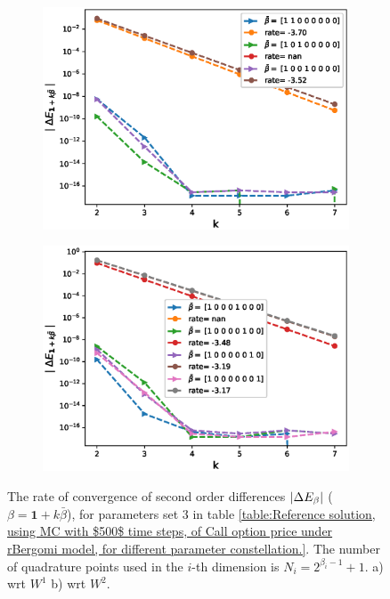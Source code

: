 \begin{figure}[h!]
	\centering
	\begin{subfigure}{.3\textwidth}
		\centering
		\includegraphics[width=1\linewidth]{./figures/rBergomi_mixed_error_rates/without_change_measure/N_4/H_002/mixed_difference_order2_rbergomi_4steps_H_002_K_1_totally_hierarch_with_rate_W1}
		\caption{}
		\label{fig:sub3}
	\end{subfigure}%
	\begin{subfigure}{.3\textwidth}
		\centering
		\includegraphics[width=1\linewidth]{./figures/rBergomi_mixed_error_rates/without_change_measure/N_4/H_002/mixed_difference_order2_rbergomi_4steps_H_002_K_1_totally_hierarch_with_rate_W2}
		\caption{}
		\label{fig:sub4}
	\end{subfigure}
	
	\caption{The rate of convergence of  second order differences $\left\lvert\Delta E_{\beta}\right\rvert$ ($\beta=\mathbf{1}+k \bar{\beta}$), for parameters set $3$ in table \ref{table:Reference solution, using MC with $500$ time steps, of Call option price under rBergomi model, for different parameter constellation.}. The number of quadrature points used in the $i$-th dimension is $N_i=2^{\beta_i-1}+1$. a) wrt $W^1$ b) wrt $W^2$.}
	\label{fig:second_diff_comp_K_1_H_002}
\end{figure}

